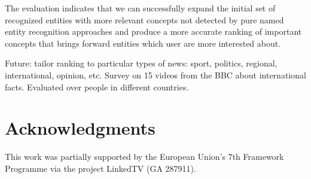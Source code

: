 \documentclass{llncs}
\begin{document}
The evaluation indicates that we can successfully expand the initial set of recognized entities with more relevant concepts not detected by pure named entity recognition approaches and produce a more accurate ranking of important concepts that brings forward entities which user are more interested about.

Future: tailor ranking to particular types of news: sport, politics, regional, international, opinion, etc.
Survey on 15 videos from the BBC about international facts. Evaluated over people in different countries.


\section*{Acknowledgments}
This work was partially supported by the European Union's 7th Framework Programme via the project LinkedTV (GA 287911).



\end{document}
